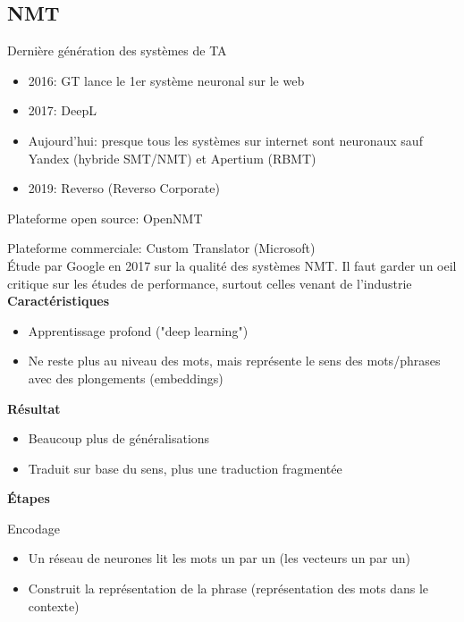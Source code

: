 \vspace{-1.2cm}

\subsection{NMT}

Dernière génération des systèmes de TA \\

\begin{itemize}
    \item 2016: GT lance le 1er système neuronal sur le web
    \item 2017: DeepL
    \item Aujourd'hui: presque tous les systèmes sur internet sont neuronaux sauf Yandex (hybride SMT/NMT) et Apertium (RBMT)
    \item 2019: Reverso (Reverso Corporate)\\
\end{itemize}

Plateforme open source: OpenNMT

Plateforme commerciale: Custom Translator (Microsoft)\\

Étude par Google en 2017 sur la qualité des systèmes NMT. Il faut garder un oeil critique sur les études de performance, surtout celles venant de l'industrie \\

\textbf{Caractéristiques}

\begin{itemize}
    \item Apprentissage profond ("deep learning")
    \item Ne reste plus au niveau des mots, mais représente le sens des mots/phrases avec des plongements (embeddings)\\
\end{itemize}

\textbf{Résultat}

\begin{itemize}
    \item Beaucoup plus de généralisations
    \item Traduit sur base du sens, plus une traduction fragmentée\\
\end{itemize}

\textbf{Étapes}

Encodage

\begin{itemize}
    \item Un réseau de neurones lit les mots un par un (les vecteurs un par un)
    \item Construit la représentation de la phrase (représentation des mots dans le contexte)\\
\end{itemize}

